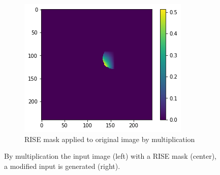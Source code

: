 \begin{figure}[H]
\begin{subfigure}[t]{.32\textwidth}
    \end{subfigure}\hfill%
    \begin{subfigure}[t]{.32\textwidth}
        \centering
        \includegraphics[width=\linewidth]{chapters/02_methods/images/rise/rise1_applied.png}
        \caption{RISE mask applied to original image by multiplication}
    \end{subfigure}
    \caption{By multiplication the input image (left) with a RISE mask (center), a modified input is generated (right).}
    \label{hdm_rise_mask}
\end{figure}
